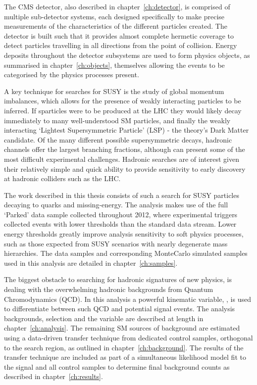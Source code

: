 The CMS detector, also described in chapter~\ref{ch:detector}, is comprised of
multiple sub-detector systems, each designed
specifically to make precise measurements of the characteristics of the
different particles created. The detector is built such that it provides almost
complete hermetic coverage to detect particles travelling in all directions
from the point of collision. Energy deposits throughout the detector subsystems
are used to form physics objects, as summarised in
chapter~\ref{ch:objects}, themselves allowing the events to be categorised by
the physics processes present.

A key technique
for searches for SUSY is the study of global momentum imbalances,
which allows for the presence of weakly interacting particles to be inferred.
If sparticles were to be produced at the LHC they would likely decay immediately
to many well-understood SM particles, and finally the weakly interacting
`Lightest Supersymmetric Particle' (LSP) - the theory's Dark Matter candidate.
Of the many different possible supersymmetric decays, hadronic channels offer
the largest branching fractions, although can present some of the most
difficult experimental challenges. Hadronic searches are of interest given their
relatively simple and quick ability to provide sensitivity to early discovery at
hadronic colliders such as the LHC.

The work described in this thesis consists of such a search for SUSY particles
decaying to quarks and missing-energy. The analysis makes use of the full
`Parked' data sample collected throughout 2012, where experimental
triggers collected events with lower thresholds than the standard data stream.
Lower energy thresholds greatly improve analysis sensitivity to soft physics
processes, such as those expected from SUSY scenarios with nearly degenerate
mass hierarchies. The data samples and corresponding MonteCarlo simulated
samples used in this analysis are detailed in chapter~\ref{ch:samples}.

The biggest obstacle to
searching for hadronic signatures of new physics, is dealing with the
overwhelming hadronic backgrounds from Quantum Chromodynamics (QCD). In this
analysis a powerful kinematic variable, \alphat, is used to differentiate
between such QCD and potential signal events. The analysis backgrounds,
selection and
the \alphat variable are described at length in chapter~\ref{ch:analysis}. The
remaining SM sources of background are estimated using a data-driven transfer
technique from dedicated control samples, orthogonal to the search region, as
outlined in chapter~\ref{ch:background}. The results of the transfer technique
are included as part of a simultaneous likelihood model fit to the signal and
all control samples to determine final background counts as described in
chapter~\ref{ch:results}.

